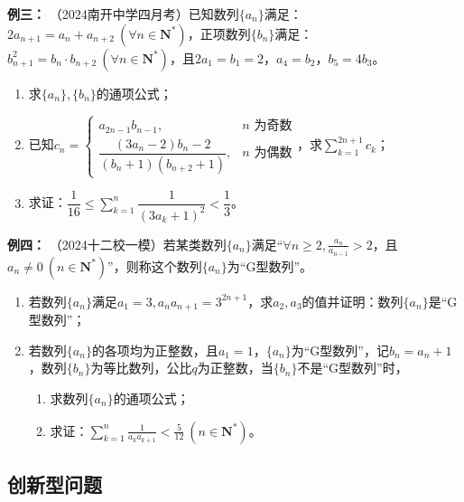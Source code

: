 \documentclass{article}
\begin{document}
\noindent \textbf{例三： }（2024南开中学四月考）已知数列$\{a_n\}$满足：$2a_{n+1}=a_n+a_{n+2}\ (\forall n\in \mathbf{N}^*)$，正项数列$\{b_n\}$满足：$b_{n+1}^2=b_n\cdot b_{n+2}\ (\forall n\in \mathbf{N}^*)$，且$2a_1=b_1=2$，$a_4=b_2$，$b_5=4b_3$。

\begin{enumerate}[label=(\Roman*)]
    \item 求$\{a_n\},\{b_n\}$的通项公式；
    
    \item 已知$c_n=\begin{cases}
    a_{2n-1}b_{n-1}, & n\text{ 为奇数} \\
    \dfrac{(3a_n-2)b_n-2}{(b_n+1)(b_{n+2}+1)}, & n\text{ 为偶数}
    \end{cases}$，求$\displaystyle\sum\limits_{k=1}^{2n+1}c_k$；
    
    \item 求证：$\dfrac{1}{16}\leqslant \displaystyle\sum\limits_{k=1}^{n}\dfrac{1}{(3a_k+1)^2}<\dfrac{1}{3}$。
\end{enumerate}
\vspace{18\baselineskip}

\noindent \textbf{例四： }（2024十二校一模）若某类数列$\{a_n\}$满足“$\forall n\geqslant 2,\displaystyle\frac{a_n}{a_{n-1}}>2$，且$a_n\neq 0\ (n\in \mathbf{N}^*)$”，则称这个数列$\{a_n\}$为“G型数列”。

\begin{enumerate}[label=(\Roman*)]
    \item 若数列$\{a_n\}$满足$a_1=3,a_na_{n+1}=3^{2n+1}$，求$a_2,a_3$的值并证明：数列$\{a_n\}$是“G型数列”；
    
    \item 若数列$\{a_n\}$的各项均为正整数，且$a_1=1$，$\{a_n\}$为“G型数列”，记$b_n=a_n+1$，数列$\{b_n\}$为等比数列，公比$q$为正整数，当$\{b_n\}$不是“G型数列”时，
    \begin{enumerate}[label=(\roman*)]
        \item 求数列$\{a_n\}$的通项公式；
        \item 求证：$\displaystyle\sum\limits_{k=1}^{n}\frac{1}{a_k a_{k+1}}<\frac{5}{12}\ (n\in \mathbf{N}^*)$。
    \end{enumerate}
\end{enumerate}
\newpage

\subsection{创新型问题}
\end{document}
